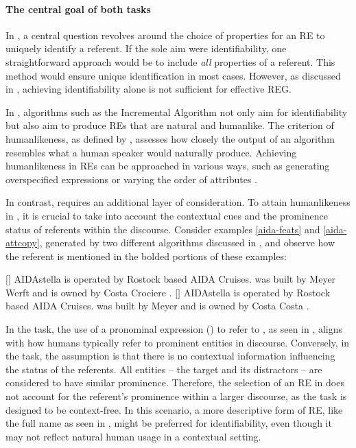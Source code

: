 \paragraph*{The central goal of both tasks}

In \shot, a central question revolves around the choice of properties for an RE to uniquely identify a referent. If the sole aim were identifiability, one straightforward approach would be to include \emph{all} properties of a referent. This method would ensure unique identification in most cases. However, as discussed in , achieving identifiability alone is not sufficient for effective REG.

In \shot, algorithms such as the Incremental Algorithm not only aim for identifiability but also aim to produce REs that are natural and humanlike. The criterion of humanlikeness, as defined by \citet{van2016computational}, assesses how closely the output of an algorithm resembles what a human speaker would naturally produce. Achieving humanlikeness in REs can be approached in various ways, such as generating overspecified expressions or varying the order of attributes \citep{van2012toward}.
 
In contrast, \context requires an additional layer of consideration. To attain humanlikeness in \context, it is crucial to take into account the contextual cues and the prominence status of referents within the discourse. Consider examples \ref{aida-feats} and \ref{aida-attcopy}, generated by two different algorithms discussed in , and observe how the referent  is mentioned in the bolded portions of these examples:

\begin{exe}
	\ex\label{aida-feats} $[$$]$ AIDAstella is operated by Rostock based AIDA Cruises.  was built by Meyer Werft and is owned by Costa Crociere .
	\ex\label{aida-attcopy} $[$$]$ AIDAstella is operated by Rostock based AIDA Cruises.  was built by Meyer and is owned by Costa Costa .
\end{exe}

In the \context task, the use of a pronominal expression () to refer to , as seen in , aligns with how humans typically refer to prominent entities in discourse. Conversely, in the \shot task, the assumption is that there is no contextual information influencing the status of the referents. All entities -- the target and its distractors -- are considered to have similar prominence. Therefore, the selection of an RE in \shot does not account for the referent's prominence within a larger discourse, as the task is designed to be context-free. In this scenario, a more descriptive form of RE, like the full name  as seen in , might be preferred for identifiability, even though it may not reflect natural human usage in a contextual setting.

